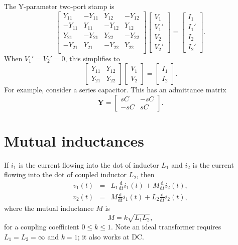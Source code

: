 \documentclass[a4paper, 12pt]{article}
\newcommand{\ud}{\mathrm{d}}
\newcommand{\udby}[1]{\frac{\ud}{\ud #1}}
\newcommand{\mat}[1]{\mathbf{#1}}
\begin{document}
The Y-parameter two-port stamp is
%
\begin{equation}
  \begin{bmatrix}
Y_{11} & -Y_{11} & Y_{12} & -Y_{12} \\
-Y_{11} & Y_{11} & -Y_{12} & Y_{12} \\
Y_{21} & -Y_{21} & Y_{22} & -Y_{22} \\
-Y_{21} & Y_{21} & -Y_{22} & Y_{22} \\
  \end{bmatrix}
  \begin{bmatrix}
    V_1 \\ V_1' \\ V_2 \\ V_2'
  \end{bmatrix}
=
\begin{bmatrix}
  I_1 \\ I_1' \\ I_2 \\ I_2'
\end{bmatrix}.
\end{equation}
%
When $V_1' = V_2' = 0$, this simplifies to
%
\begin{equation}
  \begin{bmatrix}
Y_{11} & Y_{12} \\
Y_{21} & Y_{22}
  \end{bmatrix}
  \begin{bmatrix}
    V_1 \\ V_2 
  \end{bmatrix}
=
\begin{bmatrix}
  I_1 \\ I_2 
\end{bmatrix}.
\end{equation}
%
For example, consider a series capacitor.  This has an admittance matrix
%
\begin{equation}
  \mat{Y} =
  \begin{bmatrix}
    sC & -sC \\
   -sC &  sC
  \end{bmatrix}.
\end{equation}



\section{Mutual inductances}


If $i_1$ is the current flowing into the dot of inductor $L_1$ and
$i_2$ is the current flowing into the dot of coupled inductor $L_2$,
%
then
%
\begin{eqnarray}
 v_1(t) & = & L_1 \udby{t} i_1(t) + M \udby{t} i_2(t),\\
 v_2(t) & = & M \udby{t} i_1(t) + L_2 \udby{t} i_2(t),
\label{eqn:mut}
\end{eqnarray}
%
where the mutual inductance $M$ is
%
\begin{equation}
  M = k \sqrt{L_1 L_2},
\end{equation}
%
for a coupling coefficient $0 \le k \le 1$.  Note an ideal transformer
requires $L_1 = L_2 = \infty$ and $k=1$; it also works at DC.
\end{document}
